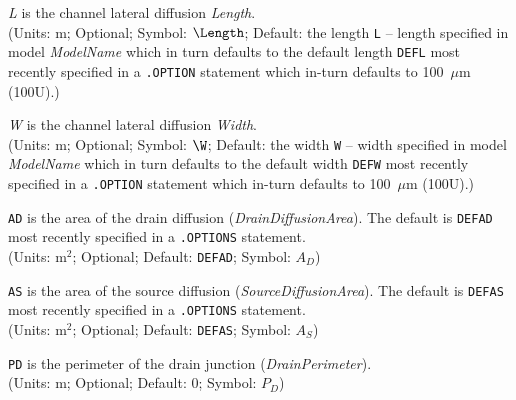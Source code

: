 \begin{widelist}
\item[{\it L}] is the channel lateral diffusion  {\it Length}.\\
               (Units: m; Optional; Symbol: $\Length$;
Default: the length
           {\tt L} -- length specified in
               model {\it ModelName} which in turn defaults to the default
               length {\tt DEFL} most recently specified in a {\tt .OPTION}
               statement which in-turn defaults to 100~$\mu$m (100U).)

\item[{\it W}] is the channel lateral diffusion {\it Width}.\\
               (Units: m; Optional; Symbol: $\W$;
Default: the width
           {\tt W} -- width specified in
               model {\it ModelName} which in turn defaults to the default
               width {\tt DEFW} most recently specified in a {\tt .OPTION}
               statement which in-turn defaults to 100~$\mu$m (100U).)

\item[{{\tt AD}}]  is the area of the drain diffusion
               ({\it DrainDiffusionArea}). The default is {\tt DEFAD}
           most recently specified in a {\tt .OPTIONS} statement.\\
               (Units: $\mbox{m}^2$; Optional; Default: {\tt DEFAD};
           Symbol: $A_D$)

\item[{{\tt AS}}]  is the area of the source diffusion
               ({\it SourceDiffusionArea}).  The default is {\tt DEFAS}
           most recently specified in a {\tt .OPTIONS} statement.\\
               (Units: $\mbox{m}^2$; Optional; Default: {\tt DEFAS};
           Symbol: $A_S$)

\item[{\tt PD}]  is the perimeter of the drain junction
               ({\it DrainPerimeter}).\\
               (Units: m; Optional; Default: 0; Symbol: $P_D$)


\end{widelist}
